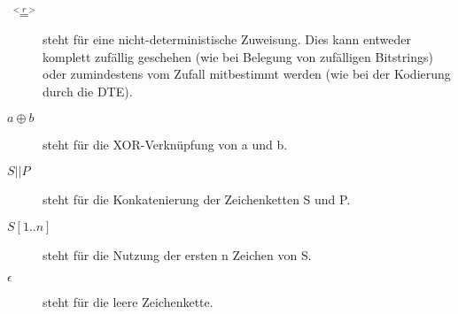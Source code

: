 \begin{description}

\item[\(\overset{<r>}{=}\)] steht für eine nicht-deterministische Zuweisung. Dies kann entweder komplett zufällig geschehen (wie bei Belegung von zufälligen Bitstrings) oder zumindestens vom Zufall mitbestimmt werden (wie bei der Kodierung durch die DTE).

\item[\(a \oplus b\)] steht für die XOR-Verknüpfung von a und b.

\item[\(S || P\)] steht für die Konkatenierung der Zeichenketten S und P.

\item[\(S{[1..n]}\)] steht für die Nutzung der ersten n Zeichen von S.

\item[\(\epsilon\)] steht für die leere Zeichenkette.

\end{description}

\newpage